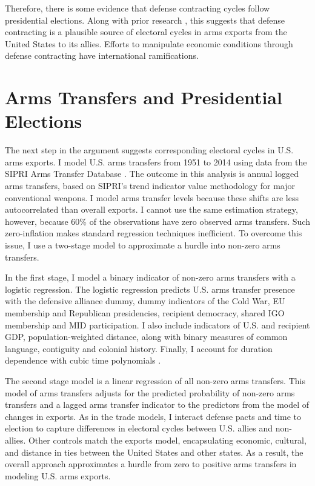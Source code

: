 \documentclass[12pt]{article}
\begin{document}
Therefore, there is some evidence that defense contracting cycles follow presidential elections.
Along with prior research \citep{DerouenHeo2000}, this suggests that defense contracting is a plausible source of electoral cycles in arms exports from the United States to its allies.
Efforts to manipulate economic conditions through defense contracting have international ramifications. 


\section{Arms Transfers and Presidential Elections}


The next step in the argument suggests corresponding electoral cycles in U.S. arms exports. 
I model U.S. arms transfers from 1951 to 2014 using data from the SIPRI Arms Transfer Database \citep{SIPRI2021}.
The outcome in this analysis is annual logged arms transfers, based on SIPRI's trend indicator value methodology for major conventional weapons.
I model arms transfer levels because these shifts are less autocorrelated than overall exports.
I cannot use the same estimation strategy, however, because 60\% of the observations have zero observed arms transfers.
Such zero-inflation makes standard regression techniques inefficient.
To overcome this issue, I use a two-stage model to approximate a hurdle into non-zero arms transfers. 


In the first stage, I model a binary indicator of non-zero arms transfers with a logistic regression. 
The logistic regression predicts U.S. arms transfer presence with the defensive alliance dummy, dummy indicators of the Cold War, EU membership and Republican presidencies, recipient democracy, shared IGO membership and MID participation. 
I also include indicators of U.S. and recipient GDP, population-weighted distance, along with binary measures of common language, contiguity and colonial history. 
Finally, I account for duration dependence with cubic time polynomials \citep{CarterSignorino2010}.


The second stage model is a linear regression of all non-zero arms transfers.
This model of arms transfers adjusts for the predicted probability of non-zero arms transfers and a lagged arms transfer indicator to the predictors from the model of changes in exports.
As in the trade models, I interact defense pacts and time to election to capture differences in electoral cycles between U.S. allies and non-allies. 
Other controls match the exports model, encapsulating economic, cultural, and distance in ties between the United States and other states. 
As a result, the overall approach approximates a hurdle from zero to positive arms transfers in modeling U.S. arms exports. 
\end{document}
